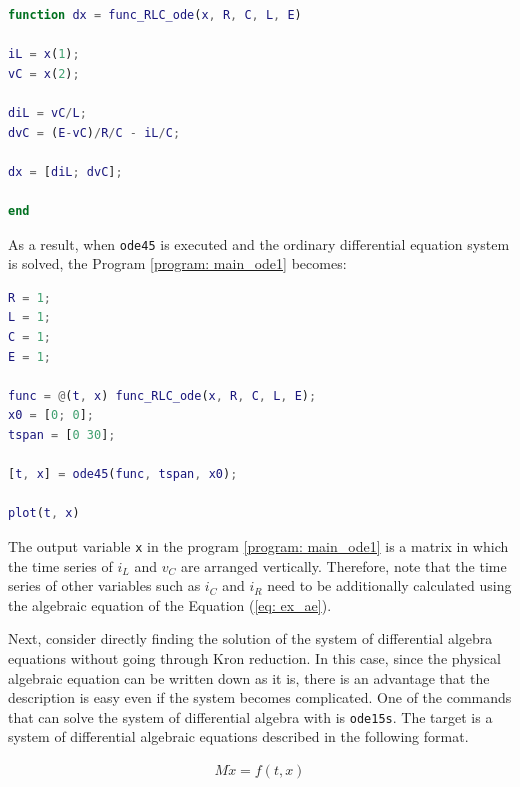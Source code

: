 \documentclass[graybox, envcountchap]{svmult}
\begin{document}
\begin{example}
\begin{lstlisting}[language=Matlab, caption=func\_RLC\_ode.m, label={program:ex1_ode}]
function dx = func_RLC_ode(x, R, C, L, E)

iL = x(1);
vC = x(2);

diL = vC/L;
dvC = (E-vC)/R/C - iL/C;

dx = [diL; dvC];

end
\end{lstlisting}

As a result, when \verb|ode45| is executed and the ordinary differential
equation system is solved, the Program \nobreak\ref{program: main_ode1} becomes:


\begin{lstlisting}[language=Matlab, caption=main\_RLC\_ode.m, label={program:main_ode1}]
R = 1;
L = 1;
C = 1;
E = 1;

func = @(t, x) func_RLC_ode(x, R, C, L, E);
x0 = [0; 0];
tspan = [0 30];

[t, x] = ode45(func, tspan, x0);

plot(t, x)
\end{lstlisting}

The output variable \verb|x| in the program \nobreak\ref{program: main_ode1} is
a matrix in which the time series of $i_L$ and $v_C$ are arranged vertically.
Therefore, note that the time series of other variables such as $i_C$ and $i_R$
need to be additionally calculated using the algebraic equation of the Equation
(\ref{eq: ex_ae}).

Next, consider directly finding the solution of the system of differential
algebra equations without going through Kron reduction. In this case, since the
physical algebraic equation can be written down as it is, there is an advantage
that the description is easy even if the system becomes complicated. One of the
commands that can solve the system of differential algebra with \matlab is
\verb|ode15s|. The target is a system of differential algebraic equations
described in the following format.

\begin{align}\label{eq:numDAE}
  M\dot{x} = f(t, x)
\end{align}


\end{example}
\end{document}
